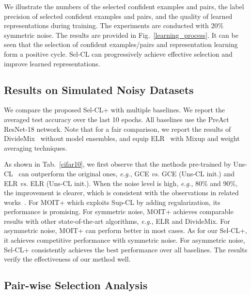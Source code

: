 \documentclass[10pt,twocolumn,letterpaper]{article}
\begin{document}
We illustrate the numbers of the selected confident examples and pairs, the label precision of selected confident examples and pairs, and the quality of learned representations during training. The experiments are conducted with 20\% symmetric noise. The results are provided in Fig.~\ref{learning_process}. It can be seen that the selection of confident examples/pairs and representation learning form a positive cycle. Sel-CL can progressively achieve effective selection and improve learned representations. 


\subsection{Results on Simulated Noisy Datasets}\label{sec:4.3}

We compare the proposed Sel-CL+ with multiple baselines. We report the averaged test accuracy over the last 10 epochs. All baselines use the PreAct ResNet-18 network. Note that for a fair comparison, we report the results of DivideMix~\cite{LiSH20} without model ensembles, and equip ELR~\cite{LiuNRF20} with Mixup and weight averaging techniques. 

As shown in Tab.~\ref{cifar10}, we first observe that the methods pre-trained by Uns-CL~\cite{chen2020simple} can outperform the original ones, \textit{e.g.}, GCE \textit{vs.} GCE (Uns-CL init.) and ELR \textit{vs.} ELR (Uns-CL init.). When the noise level is high, \textit{e.g.}, 80\% and 90\%, the improvement is clearer, which is consistent with the observations in related
works~\cite{Ghosh2021,Zheltonozhskii2021}. For MOIT+ which exploits Sup-CL by adding regularization, its performance is promising. For symmetric noise, MOIT+ achieves comparable results with other state-of-the-art algorithms, \textit{e.g.}, ELR and DivideMix. For asymmetric noise, MOIT+ can perform better in most cases. As for our Sel-CL+, it achieves competitive performance with symmetric noise. For asymmetric noise, Sel-CL+ consistently achieves the best performance over all baselines. The results verify the effectiveness of our method well. 




\subsection{Pair-wise Selection Analysis}\label{sec:4.4}
\end{document}
